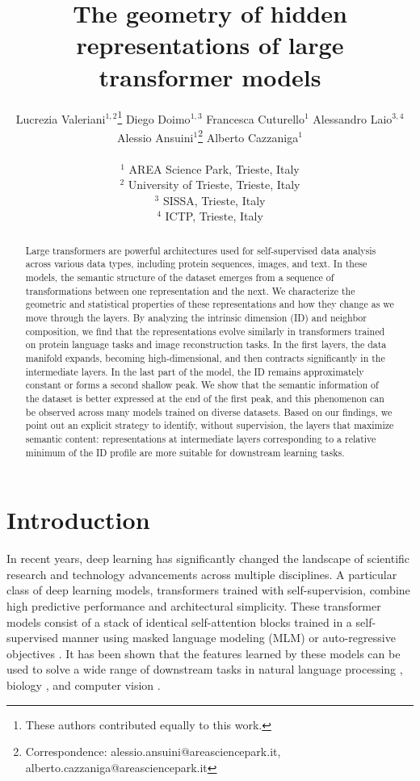 \documentclass{article}
\title{The geometry of hidden representations of large transformer models}
\author{
Lucrezia Valeriani$^{1,2}$\thanks{These authors contributed equally to this work.} 
%
\quad\quad\quad Diego Doimo$^{1,3}$\footnotemark[1] 
%
\quad\quad\quad Francesca Cuturello$^{1}$ 
%
\AND  Alessandro Laio$^{3,4}$ 
%
\quad\quad\quad Alessio Ansuini$^{1}$\thanks{Correspondence: alessio.ansuini@areasciencepark.it, alberto.cazzaniga@areasciencepark.it} 
%
\quad\quad\quad Alberto Cazzaniga$^{1}$\footnotemark[2]
\\
\\
$^1$ AREA Science Park, Trieste, Italy\\
$^2$ University of Trieste, Trieste, Italy\\
$^3$ SISSA, Trieste, Italy\\
$^4$ ICTP, Trieste, Italy
}
\begin{document}
\maketitle

\begin{abstract}
%
Large transformers are powerful architectures used for self-supervised data analysis across various data types, including protein sequences, images, and text. In these models, the semantic structure of the dataset emerges from a sequence of transformations between one representation and the next. 
%
We characterize the geometric and statistical properties of these representations and how they change as we move through the layers.
%
%
By analyzing the intrinsic dimension (ID) and neighbor composition, we find that the representations evolve similarly in transformers trained on protein language tasks and image reconstruction tasks. In the first layers, the data manifold expands, becoming high-dimensional, and then contracts significantly in the intermediate layers. 
%
In the last part of the model, the ID remains approximately constant or forms a second shallow peak. 
%
We show that the semantic information of the dataset is better expressed at the end of the first peak, and this phenomenon can be observed across many models trained on diverse datasets.
%
Based on our findings, we point out an explicit strategy to identify, without supervision, the layers that maximize semantic content: representations at intermediate layers corresponding to a relative minimum of the ID profile are more suitable for downstream learning tasks. 
\end{abstract}


\section{Introduction}
%
In recent years, deep learning has significantly changed the landscape of scientific research and technology advancements across multiple disciplines.
%
A particular class of deep learning models, transformers trained with self-supervision, combine high predictive performance and architectural simplicity.
%
These transformer models consist of a stack of identical self-attention blocks trained in a self-supervised manner using masked language modeling (MLM) or auto-regressive objectives \cite{attention-is-all,bert}. 
%
It has been shown that the features learned by these models %
can be used to solve a wide range of downstream tasks in natural language processing \cite{manning2020, colin2020, few-shot-bert}, biology \cite{rives2021biological, prot-trans,jumper2021highly,dnaBert2021}, and computer vision \cite{igpt, Kolesnikov2021,pmlr-v139-radford21a}.
\end{document}
